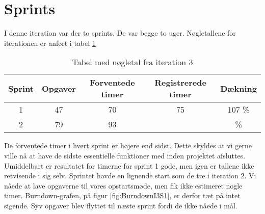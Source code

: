 \section{Sprints}

I denne iteration var der to sprints. De var begge to uger.
Nøgletallene for iterationen er anført i tabel \ref{table:iteration3sprints}

\begin{table}
\centering
\begin{tabular}{|c|c|c|c|c|}
\hline 
\textbf{Sprint} 	& \textbf{Opgaver} 	& \textbf{Forventede timer} 	& \textbf{Registrerede timer} 	& \textbf{Dækning} \\ 
\hline
1 		& 47 		& 70 				& 75						& 107 \% \\ 
\hline 
2 		& 79 		& 93 				& 						&  \% \\ 
\hline 
\end{tabular}
\caption{Tabel med nøgletal fra iteration 3}
\label{table:iteration3sprints}
\end{table}

De forventede timer i hvert sprint er højere end sidst. Dette skyldes at vi gerne ville nå at have de sidste essentielle funktioner med inden projektet afsluttes. Umiddelbart er resultatet for timerne for sprint 1 gode, men igen er tallene ikke retvisende i sig selv. Sprintet havde en lignende start som de tre i iteration 2. Vi nåede at lave opgaverne til vores opstartsmøde, men fik ikke estimeret nogle timer. Burndown-grafen, på figur \ref{fig:BurndownI3S1}, er derfor tæt på intet sigende. Syv opgaver blev flyttet til næste sprint fordi de ikke nåede i mål.

\begin{minipage}{0.5\textwidth}
\end{minipage}
